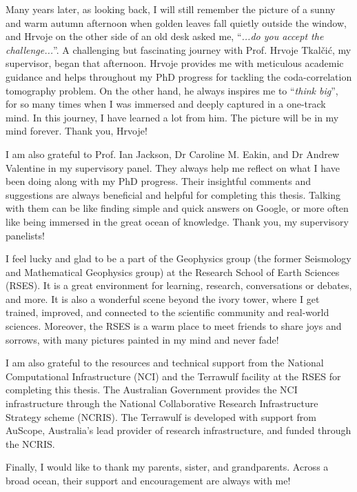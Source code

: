 \begin{acknowledgements}
\addchaptertocentry{\acknowledgementname} %
\vspace{0.4cm}
\begingroup
\normalsize
Many years later, as looking back, I will still remember the picture of a sunny and warm autumn afternoon when golden leaves fall quietly outside the window, and Hrvoje on the other side of an old desk asked me, ``\textit{...do you accept the challenge...}''. A challenging but fascinating journey with Prof. Hrvoje Tkalčić, my supervisor, began that afternoon. Hrvoje provides me with meticulous academic guidance and helps throughout my PhD progress for tackling the coda-correlation tomography problem. On the other hand, he always inspires me to ``\textit{think big}'', for so many times when I was immersed and deeply captured in a one-track mind. In this journey, I have learned a lot from him. The picture will be in my mind forever. Thank you, Hrvoje!

I am also grateful to Prof. Ian Jackson, Dr Caroline M. Eakin, and Dr Andrew Valentine in my supervisory panel. They always help me reflect on what I have been doing along with my PhD progress. Their insightful comments and suggestions are always beneficial and helpful for completing this thesis. Talking with them can be like finding simple and quick answers on Google, or more often like being immersed in the great ocean of knowledge. Thank you, my supervisory panelists!

I feel lucky and glad to be a part of the Geophysics group (the former Seismology and Mathematical Geophysics group) at the Research School of Earth Sciences (RSES). It is a great environment for learning, research, conversations or debates, and more. It is also a wonderful scene beyond the ivory tower, where I get trained, improved, and connected to the scientific community and real-world sciences. Moreover, the RSES is a warm place to meet friends to share joys and sorrows, with many pictures painted in my mind and never fade!

I am also grateful to the resources and technical support from the National Computational Infrastructure (NCI) and the Terrawulf facility at the RSES for completing this thesis. The Australian Government provides the NCI infrastructure through the National Collaborative Research Infrastructure Strategy scheme (NCRIS). The Terrawulf is developed with support from AuScope, Australia's lead provider of research infrastructure, and funded through the NCRIS.

Finally, I would like to thank my parents, sister, and grandparents. Across a broad ocean, their support and encouragement are always with me!
\endgroup
\end{acknowledgements}



